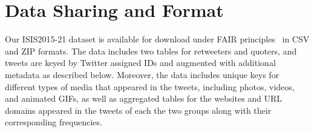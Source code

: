 \documentclass[letterpaper]{article} %
\begin{document}
\begin{table}[!htbp]
\centering
{}
\quad
{}
\caption{Distributions of top-10 frequent languages used in our tweets' texts. ``Other'' includes 38 and 49 other languages that were identified in our collection with lower frequencies for Retweeters and Quoters respectively. Numbers represent the number of tweets that are written in the corresponding languages.}
\label{table:labguages}
\end{table}


\section{Data Sharing and Format}
Our ISIS2015-21 dataset is available for download under FAIR principles~\cite{wilkinson2016fair} in CSV and ZIP formats. The data includes two tables for retweeters and quoters, and tweets are keyed by Twitter assigned IDs and augmented with additional metadata as described below. Moreover, the data includes unique keys for different types of media that appeared in the tweets, including photos, videos, and animated GIFs, as well as aggregated tables for the websites and URL domains appeared in the tweets of each the two groups along with their corresponding frequencies.
\end{document}
